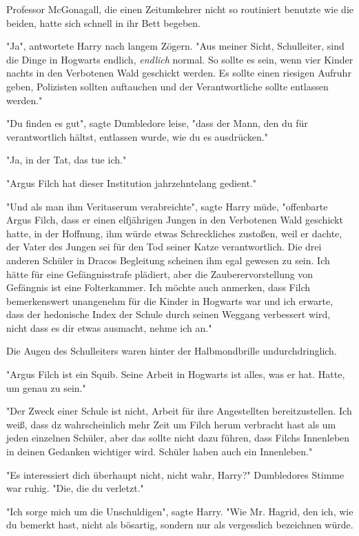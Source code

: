 {Professor McGonagall, die einen Zeitumkehrer nicht so routiniert benutzte wie die beiden, hatte sich schnell in ihr Bett begeben.

"Ja", antwortete Harry nach langem Zögern. "Aus meiner Sicht, Schulleiter, sind die Dinge in Hogwarts endlich, \emph{endlich} normal. So sollte es sein, wenn vier Kinder nachts in den Verbotenen Wald geschickt werden. Es sollte einen riesigen Aufruhr geben, Polizisten sollten auftauchen und der Verantwortliche sollte entlassen werden."

"Du finden es gut", sagte Dumbledore leise, "dass der Mann, den du für verantwortlich hältst, entlassen wurde, wie du es ausdrücken."

"Ja, in der Tat, das tue ich."

"Argus Filch hat dieser Institution jahrzehntelang gedient."

"Und als man ihm Veritaserum verabreichte", sagte Harry müde, "offenbarte Argus Filch, dass er einen elfjährigen Jungen in den Verbotenen Wald geschickt hatte, in der Hoffnung, ihm würde etwas Schreckliches zustoßen, weil er dachte, der Vater des Jungen sei für den Tod seiner Katze verantwortlich. Die drei anderen Schüler in Dracos Begleitung scheinen ihm egal gewesen zu sein. Ich hätte für eine Gefängnisstrafe plädiert, aber die Zauberervorstellung von Gefängnis ist eine Folterkammer. Ich möchte auch anmerken, dass Filch bemerkenswert unangenehm für die Kinder in Hogwarts war und ich erwarte, dass der hedonische Index der Schule durch seinen Weggang verbessert wird, nicht dass es dir etwas ausmacht, nehme ich an."

Die Augen des Schulleiters waren hinter der Halbmondbrille undurchdringlich.

"Argus Filch ist ein Squib. Seine Arbeit in Hogwarts ist alles, was er hat. Hatte, um genau zu sein."

"Der Zweck einer Schule ist nicht, Arbeit für ihre Angestellten bereitzustellen. Ich weiß, dass dz wahrscheinlich mehr Zeit um Filch herum verbracht hast als um jeden einzelnen Schüler, aber das sollte nicht dazu führen, dass Filchs Innenleben in deinen Gedanken wichtiger wird. Schüler haben auch ein Innenleben."

"Es interessiert dich überhaupt nicht, nicht wahr, Harry?" Dumbledores Stimme war ruhig. "Die, die du verletzt."

"Ich sorge mich um die Unschuldigen", sagte Harry. "Wie Mr. Hagrid, den ich, wie du bemerkt hast, nicht als bösartig, sondern nur als vergesslich bezeichnen würde.

}
